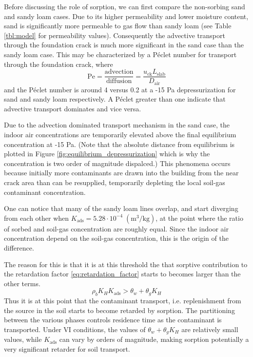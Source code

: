 Before discussing the role of sorption, we can first compare the non-sorbing sand and sandy loam cases.
Due to its higher permeability and lower moisture content, sand is significantly more permeable to gas flow than sandy loam (see Table \ref{tbl:model} for permeability values).
Consequently the advective transport through the foundation crack is much more significant in the sand case than the sandy loam case.
This may be characterized by a Péclet number for transport through the foundation crack, where
\begin{equation}\label{eq:peclet}
  \mathrm{Pe} = \frac{\mathrm{advection}}{\mathrm{diffusion}} = \frac{u_\mathrm{ck} L_\mathrm{slab}}{D_\mathrm{air}}
\end{equation}
and the Péclet number is around 4 versus 0.2 at a -15 Pa depressurization for sand and sandy loam respectively.
A Péclet greater than one indicate that advective transport dominates and vice versa.\par

Due to the advection dominated transport mechanism in the sand case, the indoor air concentrations are temporarily elevated above the final equilibrium concentration at -15 Pa.
(Note that the absolute distance from equilibrium is plotted in Figure \ref{fig:equilibrium_depressurization} which is why the concentration is two order of magnitude dispalced.)
This phenomena occurs because initially more contaminants are drawn into the building from the near crack area than can be resupplied, temporarily depleting the local soil-gas contaminant concentration.\par

One can notice that many of the sandy loam lines overlap, and start diverging from each other when $K_\mathrm{ads} = 5.28 \cdot 10^{-4} \; \mathrm{(m^3/kg)}$, at the point where the ratio of sorbed and soil-gas concentration are roughly equal.
Since the indoor air concentration depend on the soil-gas concentration, this is the origin of the difference.\par

The reason for this is that it is at this threshold the that sorptive contribution to the retardation factor \eqref{eq:retardation_factor} starts to becomes larger than the other terms.
\begin{equation}
   \rho_b K_H K_\mathrm{ads} > \theta_w + \theta_g K_H
\end{equation}
Thus it is at this point that the contaminant transport, i.e. replenishment from the source in the soil starts to become retarded by sorption.
The partitioning between the various phases controls residence time as the contaminant is transported.
Under VI conditions, the values of $\theta_w + \theta_g K_H$ are relatively small values, while $K_\mathrm{ads}$ can vary by orders of magnitude, making sorption potentially a very significant retarder for soil transport.\par

